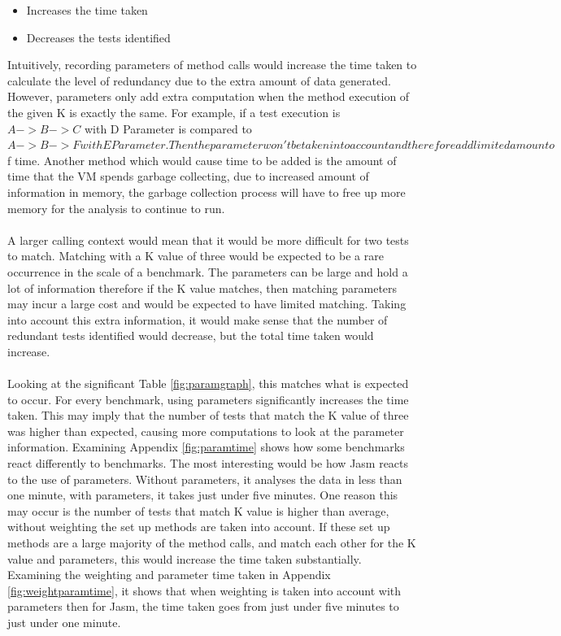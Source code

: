 \begin{itemize}
\item Increases the time taken
\item Decreases the tests identified
\end{itemize}

Intuitively, recording parameters of method calls would increase the time taken to calculate the level of redundancy due to the extra amount of data generated. However, parameters only add extra computation when the method execution of the given K is exactly the same. For example, if a test execution is $A ->  B ->  C$ with D Parameter is compared to $A ->  B ->  F with E Parameter. Then the parameter won't be taken into account and therefore add limited amount o$f time. Another method which would cause time to be added is the amount of time that the VM spends garbage collecting, due to increased amount of information in memory, the garbage collection process will have to free up more memory for the analysis to continue to run.
\paragraph{}
A larger calling context would mean that it would be more difficult for two tests to match. Matching with a K value of three would be expected to be a rare occurrence in the scale of a benchmark. The parameters can be large and hold a lot of information therefore if the K value matches, then matching parameters may incur a large cost and would be expected to have limited matching. Taking into account this extra information, it would make sense that the number of redundant tests identified would decrease, but the total time taken would increase. 
\paragraph{}
Looking at the significant Table \ref{fig:paramgraph}, this matches what is expected to occur. For every benchmark, using parameters significantly increases the time taken. This may imply that the number of tests that match the K value of three was higher than expected, causing more computations to look at the parameter information. Examining Appendix \ref{fig:paramtime} shows how some benchmarks react differently to benchmarks. The most interesting would be how Jasm reacts to the use of parameters. Without parameters, it analyses the data in less than one minute, with parameters, it takes just under five minutes. One reason this may occur is the number of tests that match K value is higher than average, without weighting the set up methods are taken into account. If these set up methods are a large majority of the method calls, and match each other for the K value and parameters, this would increase the time taken substantially. Examining the weighting and parameter time taken in Appendix \ref{fig:weightparamtime}, it shows that when weighting is taken into account with parameters then for Jasm, the time taken goes from just under five minutes to just under one minute.
